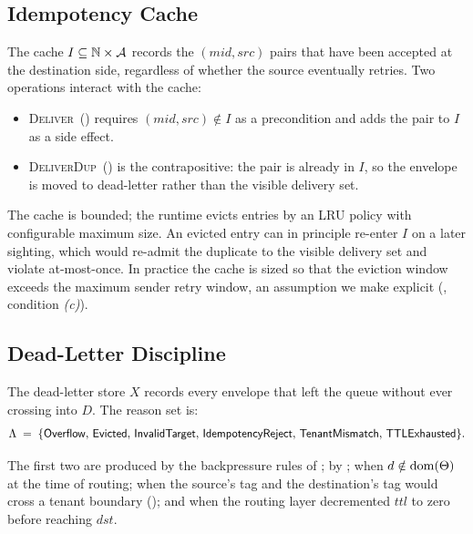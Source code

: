 \subsection{Idempotency Cache}
\label{sec:k2k:idempotency}

The cache \(I \subseteq \mathbb{N} \times \mathcal{A}\) records the
\((\mathit{mid}, \mathit{src})\) pairs that have been accepted at the
destination side, regardless of whether the source eventually retries.
Two operations interact with the cache:

\begin{itemize}
\item \textsc{Deliver}~() requires
\((\mathit{mid}, \mathit{src}) \notin I\) as a precondition and adds
the pair to \(I\) as a side effect.
\item \textsc{DeliverDup}~() is the
contrapositive: the pair is already in \(I\), so the envelope is
moved to dead-letter rather than the visible delivery set.
\end{itemize}

The cache is bounded; the runtime evicts entries by an LRU policy with
configurable maximum size.  An evicted entry can in principle re-enter
\(I\) on a later sighting, which would re-admit the duplicate to the
visible delivery set and violate at-most-once.  In practice the cache
is sized so that the eviction window exceeds the maximum sender retry
window, an assumption we make explicit
(, condition \emph{(c)}).

\subsection{Dead-Letter Discipline}
\label{sec:k2k:dlq}

The dead-letter store \(X\) records every envelope that left the
queue without ever crossing into \(D\).  The reason set is:
\[
  \Lambda \;=\;
  \{\mathsf{Overflow},\,
    \mathsf{Evicted},\,
    \mathsf{InvalidTarget},\,
    \mathsf{IdempotencyReject},\,
    \mathsf{TenantMismatch},\,
    \mathsf{TTLExhausted}\}.
\]

The first two are produced by the backpressure rules of
;  by
;  when
\(d \notin \operatorname{dom}(\Theta)\) at the time of routing;
 when the source's tag and the destination's
tag would cross a tenant boundary (); and
 when the routing layer decremented
\(\mathit{ttl}\) to zero before reaching \(\mathit{dst}\).


